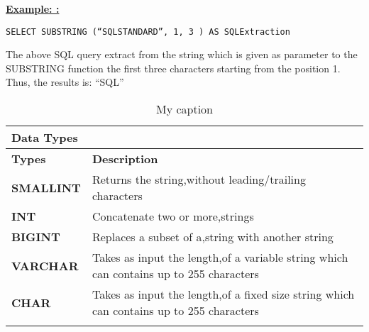 \noindent\textbf{\underline{Example: :} }
\begin{mdframed}[backgroundcolor=lightgray!20][h]
\begin{lstlisting}
SELECT SUBSTRING (“SQLSTANDARD”, 1, 3 ) AS SQLExtraction  
\end{lstlisting}
\end{mdframed}

The above SQL query extract from the string which is given as parameter to the SUBSTRING function the first three characters starting from the position 1. Thus, the results is: “SQL”

\begin{table}[h]
\centering
\caption{My caption}
\label{my-label}
\begin{tabular}{ll}
\hline
\multicolumn{2}{|l|}{\textbf{Data Types}}                                                                                                                                      \\ \hline
\multicolumn{1}{|l|}{\textbf{Types}}                           & \multicolumn{1}{l|}{\textbf{Description}}                                                                     \\ \hline
\multicolumn{1}{|l|}{{\color[HTML]{333333} \textbf{SMALLINT}}} & \multicolumn{1}{l|}{{\color[HTML]{333333} Returns the string,without leading/trailing characters}}            \\ \hline
\multicolumn{1}{|l|}{{\color[HTML]{333333} \textbf{INT}}}      & \multicolumn{1}{l|}{{\color[HTML]{333333} Concatenate two or more,strings}}                                   \\ \hline
\multicolumn{1}{|l|}{{\color[HTML]{333333} \textbf{BIGINT}}}   & \multicolumn{1}{l|}{{\color[HTML]{333333} Replaces a subset of a,string with another string}}                 \\ \hline
\multicolumn{1}{|l|}{\textbf{VARCHAR}}                         & \multicolumn{1}{l|}{Takes as input the length,of a variable string which can contains up to 255 characters}   \\ \hline
\multicolumn{1}{|l|}{\textbf{CHAR}}                            & \multicolumn{1}{l|}{Takes as input the length,of a fixed size string which can contains up to 255 characters} \\ \hline
                                                               &                                                                                                              
\end{tabular}
\end{table}

